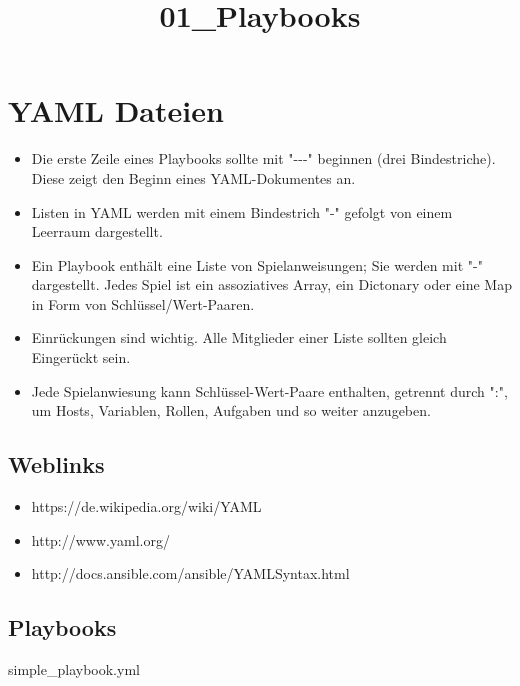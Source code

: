 \documentclass[11pt]{article}
\title{01\_Playbooks}
\providecommand{\tightlist}{%
      \setlength{\itemsep}{0pt}\setlength{\parskip}{0pt}}
\begin{document}
    
    
    \maketitle
    
    

    
    \section{YAML Dateien}\label{yaml-dateien}

\begin{itemize}
\tightlist
\item
  Die erste Zeile eines Playbooks sollte mit "-\/-\/-" beginnen (drei
  Bindestriche). Diese zeigt den Beginn eines YAML-Dokumentes an.
\item
  Listen in YAML werden mit einem Bindestrich "-" gefolgt von einem
  Leerraum dargestellt.
\item
  Ein Playbook enthält eine Liste von Spielanweisungen; Sie werden mit
  "-" dargestellt. Jedes Spiel ist ein assoziatives Array, ein Dictonary
  oder eine Map in Form von Schlüssel/Wert-Paaren.
\item
  Einrückungen sind wichtig. Alle Mitglieder einer Liste sollten gleich
  Eingerückt sein.
\item
  Jede Spielanwiesung kann Schlüssel-Wert-Paare enthalten, getrennt
  durch ":", um Hosts, Variablen, Rollen, Aufgaben und so weiter
  anzugeben.
\end{itemize}

\subsection{Weblinks}\label{weblinks}

\begin{itemize}
\tightlist
\item
  https://de.wikipedia.org/wiki/YAML
\item
  http://www.yaml.org/
\item
  http://docs.ansible.com/ansible/YAMLSyntax.html
\end{itemize}

\subsection{Playbooks}\label{playbooks}

simple\_playbook.yml
\end{document}
